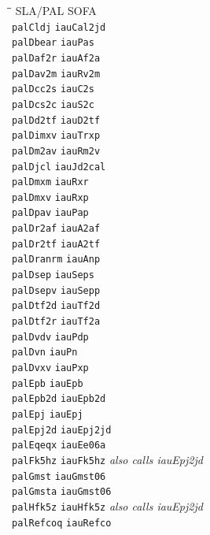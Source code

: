 \documentclass[twoside,11pt,nolof]{starlink}
\begin{document}
\begin{tabbing}
\hspace*{2cm}\=\hspace*{3cm}\= \kill
SLA/PAL \>  SOFA \\
\texttt{palCldj} \> \texttt{iauCal2jd} \\
\texttt{palDbear} \> \texttt{iauPas} \\
\texttt{palDaf2r} \> \texttt{iauAf2a} \\
\texttt{palDav2m} \>  \texttt{iauRv2m} \\
\texttt{palDcc2s} \>  \texttt{iauC2s} \\
\texttt{palDcs2c} \> \texttt{iauS2c} \\
\texttt{palDd2tf} \> \texttt{iauD2tf}\\
\texttt{palDimxv} \> \texttt{iauTrxp}\\
\texttt{palDm2av} \> \texttt{iauRm2v}\\
\texttt{palDjcl} \> \texttt{iauJd2cal}\\
\texttt{palDmxm} \> \texttt{iauRxr}\\
\texttt{palDmxv} \> \texttt{iauRxp}\\
\texttt{palDpav} \> \texttt{iauPap}\\
\texttt{palDr2af} \> \texttt{iauA2af}\\
\texttt{palDr2tf} \> \texttt{iauA2tf}\\
\texttt{palDranrm} \> \texttt{iauAnp}\\
\texttt{palDsep} \> \texttt{iauSeps}\\
\texttt{palDsepv} \> \texttt{iauSepp}\\
\texttt{palDtf2d} \> \texttt{iauTf2d}\\
\texttt{palDtf2r} \> \texttt{iauTf2a}\\
\texttt{palDvdv} \> \texttt{iauPdp}\\
\texttt{palDvn} \> \texttt{iauPn}\\
\texttt{palDvxv} \> \texttt{iauPxp}\\
\texttt{palEpb} \> \texttt{iauEpb}\\
\texttt{palEpb2d} \> \texttt{iauEpb2d}\\
\texttt{palEpj} \> \texttt{iauEpj}\\
\texttt{palEpj2d} \> \texttt{iauEpj2jd}\\
\texttt{palEqeqx} \> \texttt{iauEe06a}\\
\texttt{palFk5hz} \> \texttt{iauFk5hz} \textit{also calls iauEpj2jd}\\
\texttt{palGmst} \> \texttt{iauGmst06}\\
\texttt{palGmsta} \> \texttt{iauGmst06}\\
\texttt{palHfk5z} \> \texttt{iauHfk5z} \textit{also calls iauEpj2jd}\\
\texttt{palRefcoq} \> \texttt{iauRefco}\\
\end{tabbing}
\end{document}
